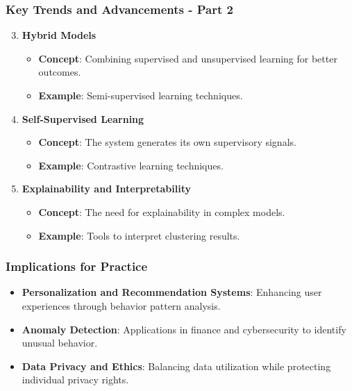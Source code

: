 \documentclass[aspectratio=169]{beamer}
\begin{document}
\begin{frame}[fragile]
    \frametitle{Key Trends and Advancements - Part 2}
    \begin{enumerate}
        \setcounter{enumi}{2}
        \item \textbf{Hybrid Models}
            \begin{itemize}
                \item \textbf{Concept}: Combining supervised and unsupervised learning for better outcomes.
                \item \textbf{Example}: Semi-supervised learning techniques.
            \end{itemize}

        \item \textbf{Self-Supervised Learning}
            \begin{itemize}
                \item \textbf{Concept}: The system generates its own supervisory signals.
                \item \textbf{Example}: Contrastive learning techniques.
            \end{itemize}

        \item \textbf{Explainability and Interpretability}
            \begin{itemize}
                \item \textbf{Concept}: The need for explainability in complex models.
                \item \textbf{Example}: Tools to interpret clustering results.
            \end{itemize}
    \end{enumerate}
\end{frame}

\begin{frame}[fragile]
    \frametitle{Implications for Practice}
    \begin{itemize}
        \item \textbf{Personalization and Recommendation Systems}: Enhancing user experiences through behavior pattern analysis.
        \item \textbf{Anomaly Detection}: Applications in finance and cybersecurity to identify unusual behavior.
        \item \textbf{Data Privacy and Ethics}: Balancing data utilization while protecting individual privacy rights.
    \end{itemize}
\end{frame}
\end{document}
